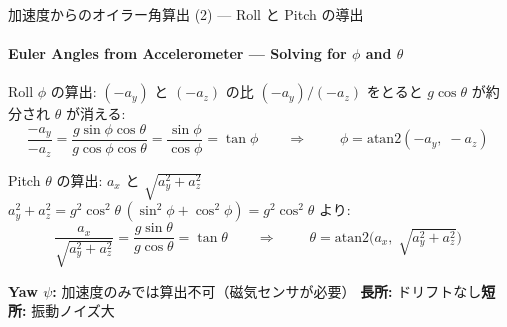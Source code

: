\begin{frame}{加速度からのオイラー角算出 (2) --- Roll と Pitch の導出}
  \framesubtitle{Euler Angles from Accelerometer --- Solving for $\phi$ and $\theta$}

  \begin{block}{Roll $\phi$ の算出: $(-a_y)$ と $(-a_z)$ の比}
    {\small
    $(-a_y)/(-a_z)$ をとると $g\cos\theta$ が約分され $\theta$ が消える:
    }
    \vspace{-0.5em}
    {\footnotesize
    \[
    \frac{-a_y}{-a_z}
    = \frac{g\sin\phi\cos\theta}{g\cos\phi\cos\theta}
    = \frac{\sin\phi}{\cos\phi}
    = \tan\phi
    \qquad\Longrightarrow\qquad
    \boxed{\;\phi = \mathrm{atan2}(-a_y,\; -a_z)\;}
    \]
    }
  \end{block}

  \vspace{-0.5em}

  \begin{block}{Pitch $\theta$ の算出: $a_x$ と $\sqrt{a_y^2 + a_z^2}$}
    {\small
    $a_y^2 + a_z^2 = g^2\cos^2\!\theta\,(\sin^2\!\phi + \cos^2\!\phi) = g^2\cos^2\!\theta$ より:
    }
    \vspace{-0.5em}
    {\footnotesize
    \[
    \frac{a_x}{\sqrt{a_y^2 + a_z^2}}
    = \frac{g\sin\theta}{g\cos\theta}
    = \tan\theta
    \qquad\Longrightarrow\qquad
    \boxed{\;\theta = \mathrm{atan2}\!\bigl(a_x,\;\sqrt{a_y^2 + a_z^2}\bigr)\;}
    \]
    }
  \end{block}

  \vspace{-0.3em}

  {\scriptsize
    \textbf{Yaw $\psi$:} 加速度のみでは算出不可（磁気センサが必要）\quad
    \textbf{長所:} ドリフトなし\quad \textbf{短所:} 振動ノイズ大
  }
\end{frame}

